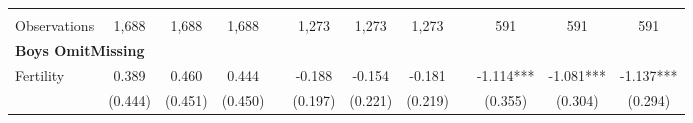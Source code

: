 \begin{landscape}
\begin{table}[htpb!]
\begin{center}
\begin{tabular}{lcccp{2mm}cccp{2mm}ccc}
\begin{footnotesize}\end{footnotesize}&\begin{footnotesize}\end{footnotesize}&\begin{footnotesize}\end{footnotesize}&\begin{footnotesize}\end{footnotesize}&\begin{footnotesize}\end{footnotesize}&\begin{footnotesize}\end{footnotesize}&\begin{footnotesize}\end{footnotesize}&\begin{footnotesize}\end{footnotesize}&\begin{footnotesize}\end{footnotesize}&\begin{footnotesize}\end{footnotesize}&\begin{footnotesize}\end{footnotesize}&\begin{footnotesize}\end{footnotesize}\\Observations&1,688&1,688&1,688&&1,273&1,273&1,273&&591&591&591\\
\multicolumn{12}{l}{\textbf{Boys OmitMissing}}\\ 
Fertility&0.389&0.460&0.444&&-0.188&-0.154&-0.181&&-1.114***&-1.081***&-1.137***\\
&(0.444)&(0.451)&(0.450)&&(0.197)&(0.221)&(0.219)&&(0.355)&(0.304)&(0.294)\\

\end{tabular}
\end{center}
\end{table}
\end{landscape}
